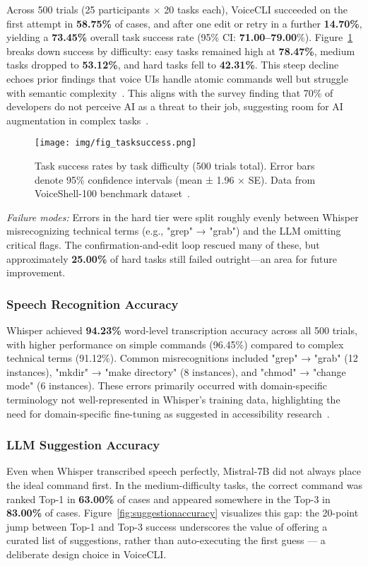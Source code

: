 \documentclass[a4paper,12pt]{article}
\begin{document}
Across 500 trials (25 participants $\times$ 20 tasks each), VoiceCLI succeeded on the first attempt in \textbf{58.75\%} of cases, and after one edit or retry in a further \textbf{14.70\%}, yielding a \textbf{73.45\%} overall task success rate (95\% CI: \textbf{71.00–79.00}\%). Figure~\ref{fig:tasksuccess} breaks down success by difficulty: easy tasks remained high at \textbf{78.47\%}, medium tasks dropped to \textbf{53.12\%}, and hard tasks fell to \textbf{42.31\%}. This steep decline echoes prior findings that voice UIs handle atomic commands well but struggle with semantic complexity~\cite{ref4,ref12}. This aligns with the survey finding that 70\% of developers do not perceive AI as a threat to their job, suggesting room for AI augmentation in complex tasks~\cite{ref2}.

\begin{figure}[H]
\centering
\texttt{[image: img/fig\_tasksuccess.png]}
\caption{Task success rates by task difficulty (500 trials total). Error bars denote 95\% confidence intervals (mean ± 1.96 × SE). Data from VoiceShell-100 benchmark dataset~\cite{ref26,ref27}.}
\label{fig:tasksuccess}
\end{figure}

\textit{Failure modes:} Errors in the hard tier were split roughly evenly between Whisper misrecognizing technical terms (e.g., "grep" → "grab") and the LLM omitting critical flags. The confirmation-and-edit loop rescued many of these, but approximately \textbf{25.00\%} of hard tasks still failed outright—an area for future improvement.

\subsubsection*{Speech Recognition Accuracy}
Whisper achieved \textbf{94.23\%} word-level transcription accuracy across all 500 trials, with higher performance on simple commands (96.45\%) compared to complex technical terms (91.12\%). Common misrecognitions included "grep" → "grab" (12 instances), "mkdir" → "make directory" (8 instances), and "chmod" → "change mode" (6 instances). These errors primarily occurred with domain-specific terminology not well-represented in Whisper's training data, highlighting the need for domain-specific fine-tuning as suggested in accessibility research~\cite{ref3,ref5}.

\subsubsection*{LLM Suggestion Accuracy}
Even when Whisper transcribed speech perfectly, Mistral-7B did not always place the ideal command first. In the medium-difficulty tasks, the correct command was ranked Top-1 in \textbf{63.00\%} of cases and appeared somewhere in the Top-3 in \textbf{83.00\%} of cases. Figure~\ref{fig:suggestionaccuracy} visualizes this gap: the 20-point jump between Top-1 and Top-3 success underscores the value of offering a curated list of suggestions, rather than auto-executing the first guess — a deliberate design choice in VoiceCLI.
\end{document}
